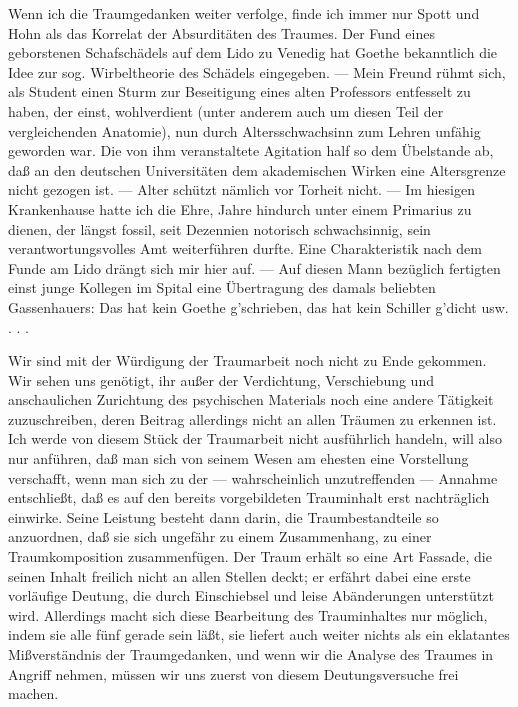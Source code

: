 \documentclass[twoside=true,titlepage=false,open=any, parskip=never, fontsize=10pt, headings=small, chapterprefix=false, appendixprefix=false]{scrbook}
\begin{document}
            
        \pstart
        Wenn ich die Traumgedanken weiter verfolge, finde ich immer nur Spott und Hohn als das Korrelat der Absurditäten des
                  Traumes. Der Fund eines geborstenen Schafschädels auf dem Lido zu
               Venedig hat Goethe bekanntlich die Idee zur sog.
               Wirbeltheorie des Schädels eingegeben. — Mein Freund rühmt sich, als Student
               einen Sturm zur Beseitigung eines alten Professors entfesselt zu haben, der
               einst, wohlverdient (unter anderem auch um diesen Teil der vergleichenden
               Anatomie), nun durch Altersschwachsinn zum
               Lehren unfähig geworden war. Die von ihm veranstaltete Agitation half so dem
               Übelstande ab, daß an den deutschen Universitäten dem akademischen Wirken
               eine Altersgrenze nicht gezogen ist. — Alter schützt nämlich vor Torheit nicht. — Im hiesigen
               Krankenhause hatte ich die Ehre, Jahre hindurch unter einem Primarius zu
               dienen, der längst fossil, seit Dezennien notorisch
                  schwachsinnig, sein verantwortungsvolles Amt weiterführen durfte. Eine
               Charakteristik nach dem Funde am Lido drängt sich mir hier auf. — Auf diesen
               Mann bezüglich fertigten einst junge Kollegen im Spital eine Übertragung des
               damals beliebten Gassenhauers: Das hat kein Goethe g’schrieben, das hat kein Schiller g’dicht usw. . . .
        \pend
    
         
            
            
            \pstart{}\pend
            
        \pstart
        Wir sind mit der Würdigung der Traumarbeit noch nicht zu Ende gekommen. Wir
               sehen uns genötigt, ihr außer der Verdichtung, Verschiebung und
               anschaulichen Zurichtung des psychischen Materials noch eine andere
               Tätigkeit zuzuschreiben, deren Beitrag allerdings nicht an allen Träumen zu
               erkennen ist. Ich werde von diesem Stück der Traumarbeit nicht ausführlich
               handeln, will also nur anführen, daß man sich von seinem Wesen am ehesten eine
               Vorstellung verschafft, wenn man sich zu der — wahrscheinlich unzutreffenden —
               Annahme entschließt, daß es auf den bereits vorgebildeten
                  Trauminhalt erst nachträglich einwirke. Seine Leistung besteht dann
               darin, die Traumbestandteile so anzuordnen, daß sie sich ungefähr zu einem
               Zusammenhang, zu einer Traumkomposition zusammenfügen. Der Traum
               erhält so eine Art Fassade, die seinen Inhalt freilich nicht an allen Stellen
               deckt; er erfährt dabei eine erste vorläufige Deutung, die durch Einschiebsel
               und leise Abänderungen unterstützt wird. Allerdings macht sich diese Bearbeitung
               des Trauminhaltes nur möglich, indem sie alle fünf gerade sein läßt, sie
               liefert auch weiter nichts als ein eklatantes Mißverständnis der Traumgedanken,
               und wenn wir die Analyse des Traumes in Angriff nehmen, müssen wir uns zuerst
               von diesem Deutungsversuche frei machen.
        \pend
    
\end{document}
